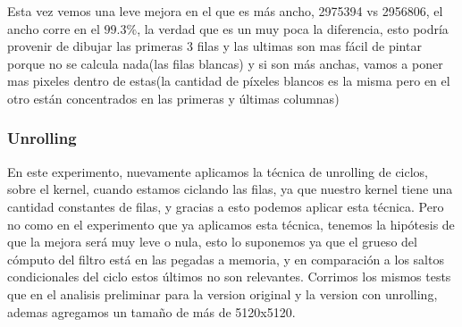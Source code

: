 Esta vez vemos una leve mejora en el que es más ancho, 2975394 vs 2956806, el ancho corre en el $99.3\%$, la verdad que es un muy poca la diferencia, esto podría provenir de dibujar las primeras 3 filas y las ultimas son mas fácil de pintar porque no se calcula nada(las filas blancas) y si son más anchas, vamos a poner mas pixeles dentro de estas(la cantidad de píxeles blancos es la misma pero en el otro están concentrados en las primeras y últimas columnas) 

\subsubsection*{Unrolling}

En este experimento, nuevamente aplicamos la técnica de unrolling de ciclos, sobre el kernel, cuando estamos ciclando las filas, ya que nuestro kernel tiene una cantidad constantes de filas, y gracias a esto podemos aplicar esta técnica. Pero no como en el experimento que ya aplicamos esta técnica, tenemos la hipótesis de que la mejora será muy leve o nula, esto lo suponemos ya que el grueso del cómputo del filtro está en las pegadas a memoria, y en comparación a los saltos condicionales del ciclo estos últimos no son relevantes. Corrimos los mismos tests que en el analisis preliminar para la version original y la version con unrolling, ademas agregamos un tamaño de más de 5120x5120.

